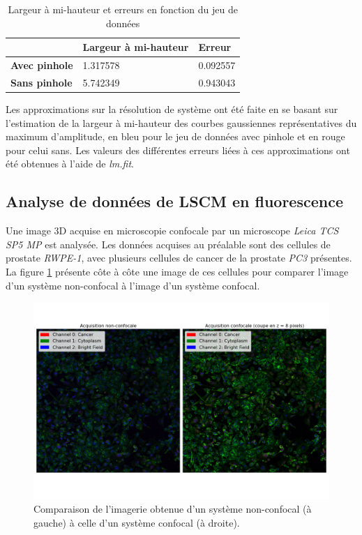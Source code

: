 \documentclass[11pt,letterpaper]{article}
\begin{document}
\begin{table}[H]
\centering
\begin{tabular}{|p{3.2cm}|p{4.2cm}|p{3.2cm}|}
\cline{2-3}
\multicolumn{1}{c|}{} & \textbf{Largeur à mi-hauteur} & \textbf{Erreur} \\
\hline
\textbf{Avec pinhole} & 1.317578 & 0.092557 \\
\hline
\textbf{Sans pinhole} & 5.742349 & 0.943043 \\
\hline
\end{tabular}
\caption{Largeur à mi-hauteur et erreurs en fonction du jeu de données}
\label{FMWH}
\end{table}

Les approximations sur la résolution de système ont été faite en se basant sur l'estimation de la largeur à mi-hauteur des courbes gaussiennes représentatives du maximum d'amplitude, en bleu pour le jeu de données avec pinhole et en rouge pour celui sans. Les valeurs des différentes erreurs liées à ces approximations ont été obtenues à l'aide de \textit{lm.fit}.

\subsection{Analyse de données de LSCM en fluorescence}

Une image 3D acquise en microscopie confocale par un microscope \textit{Leica TCS SP5 MP} est analysée. Les données
acquises au préalable sont des cellules de prostate \textit{RWPE-1}, avec plusieurs cellules de cancer de la prostate
\textit{PC3} présentes. La figure \ref{non_yes_confo} présente côte à côte une image de ces cellules pour comparer
l'image d'un système non-confocal à l'image d'un système confocal.

\begin{figure}[H]
  \centering
  \includegraphics[scale=0.45]{non_and_yes_confocal.png}
  \caption{Comparaison de l'imagerie obtenue d'un système non-confocal (à gauche) à celle d'un système confocal (à droite).}
  \label{non_yes_confo}
\end{figure}
\end{document}
